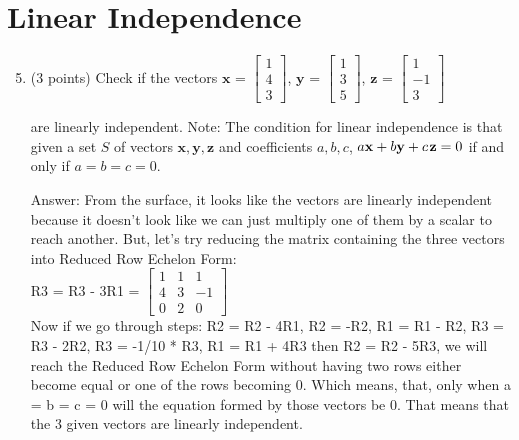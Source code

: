 \documentclass{article}%
\begin{document}
\section*{Linear Independence}
\begin{enumerate}
  \setcounter{enumi}{4}
    \item  (3 points) Check if the vectors $\mathbf{x}$ = $\begin{bmatrix} 
    1 \\ 4 \\ 3 \end{bmatrix}$, $\mathbf{y}$ = $\begin{bmatrix} 
    1 \\ 3 \\ 5 \end{bmatrix}$, $\mathbf{z}$ = $\begin{bmatrix} 
    1 \\ -1 \\ 3 \end{bmatrix}$
    
    are linearly independent. 
    Note: The condition for linear independence is that given a set $S$ of vectors $\mathbf{x},\mathbf{y},\mathbf{z}$ and coefficients $a, b, c$, $a \mathbf{x} + b \mathbf{y} + c \hspace{0.25ex}\mathbf{z} = 0$ if and only if $a = b = c = 0$.\vspace{2ex}


    Answer: From the surface, it looks like the vectors are linearly independent because it doesn't look like we can just multiply one of them by a scalar to reach another. But, let's try reducing the matrix containing the three vectors into Reduced Row Echelon Form: \\
    R3 = R3 - 3R1 = $\begin{bmatrix} 1 & 1 & 1 \\ 4 & 3 & -1 \\ 0 & 2 & 0 \end{bmatrix} $ \\
    Now if we go through steps: R2 = R2 - 4R1, R2 = -R2, R1 = R1 - R2, R3 = R3 - 2R2, R3 = -1/10 * R3, R1 = R1 + 4R3 then R2 = R2 - 5R3, we will reach the Reduced Row Echelon Form without having two rows either become equal or one of the rows becoming 0. Which means, that, only when a = b = c = 0 will the equation formed by those vectors be 0.
    That means that the 3 given vectors are linearly independent.


\end{enumerate}
\end{document}
